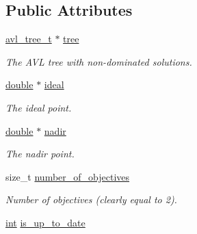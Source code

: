 \subsection*{Public Attributes}
\begin{DoxyCompactItemize}
\item 
\hyperlink{structavl__tree}{avl\+\_\+tree\+\_\+t} $\ast$ \hyperlink{structcoco__archive__s_a97b3c2075f8e042c086c6f3e6157d896}{tree}\hypertarget{structcoco__archive__s_a97b3c2075f8e042c086c6f3e6157d896}{}\label{structcoco__archive__s_a97b3c2075f8e042c086c6f3e6157d896}

\begin{DoxyCompactList}\small\item\em The A\+VL tree with non-\/dominated solutions. \end{DoxyCompactList}\item 
\hyperlink{classdouble}{double} $\ast$ \hyperlink{structcoco__archive__s_a60f86bee6a96a2461b648e73cd7af7aa}{ideal}\hypertarget{structcoco__archive__s_a60f86bee6a96a2461b648e73cd7af7aa}{}\label{structcoco__archive__s_a60f86bee6a96a2461b648e73cd7af7aa}

\begin{DoxyCompactList}\small\item\em The ideal point. \end{DoxyCompactList}\item 
\hyperlink{classdouble}{double} $\ast$ \hyperlink{structcoco__archive__s_adf39c53ebcf1e50928b42fa713802ee2}{nadir}\hypertarget{structcoco__archive__s_adf39c53ebcf1e50928b42fa713802ee2}{}\label{structcoco__archive__s_adf39c53ebcf1e50928b42fa713802ee2}

\begin{DoxyCompactList}\small\item\em The nadir point. \end{DoxyCompactList}\item 
size\+\_\+t \hyperlink{structcoco__archive__s_a1e435a9dbc6d980564394f7eebffc78f}{number\+\_\+of\+\_\+objectives}\hypertarget{structcoco__archive__s_a1e435a9dbc6d980564394f7eebffc78f}{}\label{structcoco__archive__s_a1e435a9dbc6d980564394f7eebffc78f}

\begin{DoxyCompactList}\small\item\em Number of objectives (clearly equal to 2). \end{DoxyCompactList}\item 
\hyperlink{classint}{int} \hyperlink{structcoco__archive__s_aee0e2f14067a2e1e7ab6f9b510334d85}{is\+\_\+up\+\_\+to\+\_\+date}\hypertarget{structcoco__archive__s_aee0e2f14067a2e1e7ab6f9b510334d85}{}\label{structcoco__archive__s_aee0e2f14067a2e1e7ab6f9b510334d85}


\end{DoxyCompactItemize}
